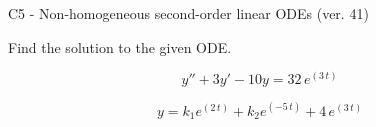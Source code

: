 \begin{exercise}
  \begin{exerciseTitle}C5 - Non-homogeneous second-order linear ODEs (ver. 41)\end{exerciseTitle}
  \begin{exerciseStatement}
    
Find the solution to the given ODE.

    
\[y''+3y'-10y = 32 \, e^{\left(3 \, t\right)}\]

  \end{exerciseStatement}
  \begin{exerciseAnswer}
    
\[y= k_{1} e^{\left(2 \, t\right)} + k_{2} e^{\left(-5 \, t\right)} + 4 \, e^{\left(3 \, t\right)}\]

  \end{exerciseAnswer}
\end{exercise}